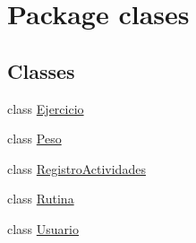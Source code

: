 \hypertarget{namespaceclases}{}\section{Package clases}
\label{namespaceclases}
\subsection*{Classes}
\begin{DoxyCompactItemize}
\item 
class \mbox{\hyperlink{classclases_1_1_ejercicio}{Ejercicio}}
\item 
class \mbox{\hyperlink{classclases_1_1_peso}{Peso}}
\item 
class \mbox{\hyperlink{classclases_1_1_registro_actividades}{Registro\+Actividades}}
\item 
class \mbox{\hyperlink{classclases_1_1_rutina}{Rutina}}
\item 
class \mbox{\hyperlink{classclases_1_1_usuario}{Usuario}}
\end{DoxyCompactItemize}

